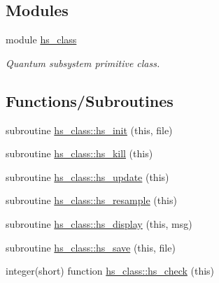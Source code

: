 \subsection*{Modules}
\begin{DoxyCompactItemize}
\item 
module \hyperlink{namespacehs__class}{hs\+\_\+class}
\begin{DoxyCompactList}\small\item\em Quantum subsystem primitive class. \end{DoxyCompactList}\end{DoxyCompactItemize}
\subsection*{Functions/\+Subroutines}
\begin{DoxyCompactItemize}
\item 
subroutine \hyperlink{namespacehs__class_a7857d1f3d6a49cfbc7d397a084a9013f}{hs\+\_\+class\+::hs\+\_\+init} (this, file)
\item 
subroutine \hyperlink{namespacehs__class_a1d1b34bdecfb1004bd277bf53dbd3e92}{hs\+\_\+class\+::hs\+\_\+kill} (this)
\item 
subroutine \hyperlink{namespacehs__class_a8a479624da65dc4f4a5cae9826487bec}{hs\+\_\+class\+::hs\+\_\+update} (this)
\item 
subroutine \hyperlink{namespacehs__class_abf39e51fc1d47061279287a7e328d9d4}{hs\+\_\+class\+::hs\+\_\+resample} (this)
\item 
subroutine \hyperlink{namespacehs__class_af457ecc48ec3ffc1c107162e546155ce}{hs\+\_\+class\+::hs\+\_\+display} (this, msg)
\item 
subroutine \hyperlink{namespacehs__class_a3b78604825b27d4d06a70aac14b8c538}{hs\+\_\+class\+::hs\+\_\+save} (this, file)
\item 
integer(short) function \hyperlink{namespacehs__class_add814b6ed9b2a64f43ea34b91ce20894}{hs\+\_\+class\+::hs\+\_\+check} (this)
\end{DoxyCompactItemize}

